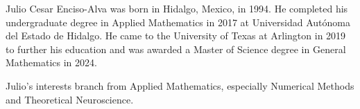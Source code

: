 
Julio Cesar Enciso-Alva was born in Hidalgo, Mexico, in 1994.
%
He completed his undergraduate degree in Applied Mathematics in 2017 at Universidad Aut\'{o}noma del Estado de Hidalgo.
%
He came to the University of Texas at Arlington in 2019 to further his education and was awarded a Master of Science degree in General Mathematics in 2024.

Julio's interests branch from Applied Mathematics, especially Numerical Methods and Theoretical Neuroscience.